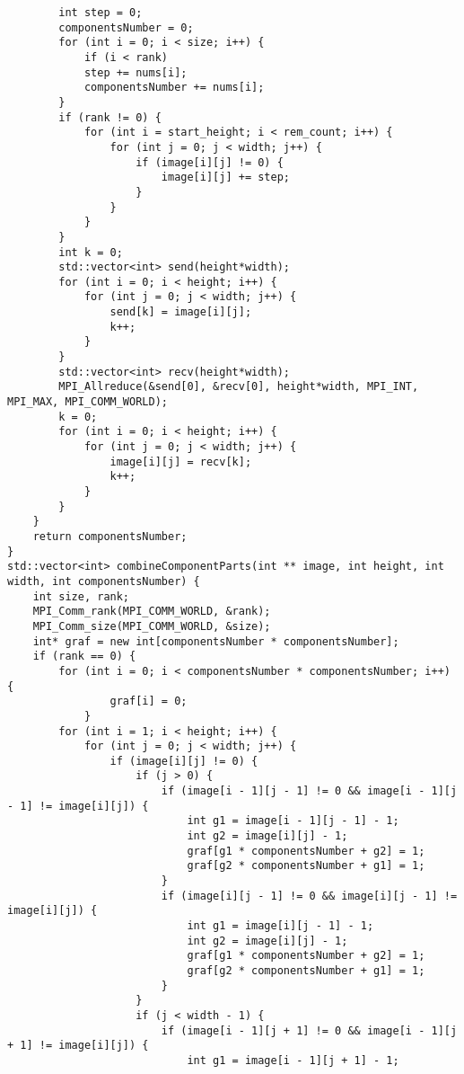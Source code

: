 \documentclass{report}
\begin{document}
\begin{lstlisting}
        int step = 0;
        componentsNumber = 0;
        for (int i = 0; i < size; i++) {
            if (i < rank)
            step += nums[i];
            componentsNumber += nums[i];
        }
        if (rank != 0) {
            for (int i = start_height; i < rem_count; i++) {
                for (int j = 0; j < width; j++) {
                    if (image[i][j] != 0) {
                        image[i][j] += step;
                    }
                }
            }
        }
        int k = 0;
        std::vector<int> send(height*width);
        for (int i = 0; i < height; i++) {
            for (int j = 0; j < width; j++) {
                send[k] = image[i][j];
                k++;
            }
        }
        std::vector<int> recv(height*width);
        MPI_Allreduce(&send[0], &recv[0], height*width, MPI_INT, MPI_MAX, MPI_COMM_WORLD);
        k = 0;
        for (int i = 0; i < height; i++) {
            for (int j = 0; j < width; j++) {
                image[i][j] = recv[k];
                k++;
            }
        }
    }
    return componentsNumber;
}
std::vector<int> combineComponentParts(int ** image, int height, int width, int componentsNumber) {
    int size, rank;
    MPI_Comm_rank(MPI_COMM_WORLD, &rank);
    MPI_Comm_size(MPI_COMM_WORLD, &size);
    int* graf = new int[componentsNumber * componentsNumber];
    if (rank == 0) {  
        for (int i = 0; i < componentsNumber * componentsNumber; i++) {
                graf[i] = 0;
            }        
        for (int i = 1; i < height; i++) {
            for (int j = 0; j < width; j++) {
                if (image[i][j] != 0) {
                    if (j > 0) {
                        if (image[i - 1][j - 1] != 0 && image[i - 1][j - 1] != image[i][j]) {
                            int g1 = image[i - 1][j - 1] - 1;
                            int g2 = image[i][j] - 1;
                            graf[g1 * componentsNumber + g2] = 1;
                            graf[g2 * componentsNumber + g1] = 1;
                        }
                        if (image[i][j - 1] != 0 && image[i][j - 1] != image[i][j]) {
                            int g1 = image[i][j - 1] - 1;
                            int g2 = image[i][j] - 1;
                            graf[g1 * componentsNumber + g2] = 1;
                            graf[g2 * componentsNumber + g1] = 1;
                        }
                    }
                    if (j < width - 1) {
                        if (image[i - 1][j + 1] != 0 && image[i - 1][j + 1] != image[i][j]) {
                            int g1 = image[i - 1][j + 1] - 1;

\end{lstlisting}
\end{document}
